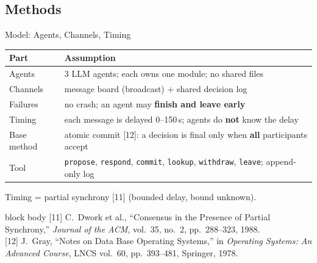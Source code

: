 \documentclass[aspectratio=169,11pt]{beamer}
\newcommand{\papercite}[1]{%
  \vfill
  \begin{beamercolorbox}[wd=\textwidth,sep=3pt]{block body}
    \tiny #1
  \end{beamercolorbox}}
\begin{document}
\subsection{Methods}
\begin{frame}{Model: Agents, Channels, Timing}
  \small
  \begin{tabular}{p{3.0cm}p{10.2cm}}
    \toprule
    Part & Assumption \\
    \midrule
    Agents & 3 LLM agents; each owns one module; no shared files \\
    \leavevmode\pause Channels & message board (broadcast) + shared decision log \\
    \leavevmode\pause Failures & no crash; an agent may \textbf{finish and leave early} \\
    \leavevmode\pause Timing & each message is delayed 0--150\,s; agents do \textbf{not} know the delay \\
    \leavevmode\pause Base method & atomic commit [12]: a decision is final only when \textbf{all} participants accept \\
    \leavevmode\pause Tool & \texttt{propose}, \texttt{respond}, \texttt{commit}, \texttt{lookup}, \texttt{withdraw}, \texttt{leave}; append-only log \\
    \bottomrule
  \end{tabular}

  \vspace{0.6em}
  \pause\small
  Timing = partial synchrony [11] (bounded delay, bound unknown).
  \papercite{
  [11] C.\ Dwork et al., ``Consensus in the Presence of Partial Synchrony,'' \textit{Journal of the ACM}, vol.\ 35, no.\ 2, pp.\ 288--323, 1988.\\
  {}[12] J.\ Gray, ``Notes on Data Base Operating Systems,'' in \textit{Operating Systems: An Advanced Course}, LNCS vol.\ 60, pp.\ 393--481, Springer, 1978.}
\end{frame}
\end{document}
